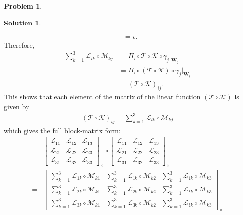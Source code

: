 \documentclass{article}
\theoremstyle{definition}
\newtheorem*{prob*}{Problem}
\newtheorem*{sln*}{Solution}
\newcommand{\W}{\mathbf{W}}
\newcommand{\lag}{\mathcal{L}}
\newcommand{\M}{\mathcal{M}}
\newcommand{\K}{\mathcal{K}}
\newcommand{\T}{\mathcal{T}}
\begin{document}
\begin{prob*}
\begin{sln*}
\begin{enumerate}
\begin{enumerate}
\begin{align*}
			&= v.
			\end{align*}
			Therefore,
			\begin{align*}
			\sum^3_{k=1} \lag_{ik} \circ \M_{kj} 
			&= \Pi_i \circ \T \circ \K \circ \gamma_j\bigg\vert_{\W_j}\\
			&= \Pi_i \circ \left(\T \circ \K\right) \circ \gamma_j\bigg\vert_{\W_j}\\
			&= (\T \circ \K)_{ij}.
			\end{align*}
			This shows that each element of the matrix of the linear function $(\T\circ \K)$ is given by
			\begin{align*}
			\boxed{(\T\circ\K)_{ij} = \sum^3_{k=1} \lag_{ik} \circ \M_{kj}}
			\end{align*}
			which gives the full block-matrix form:
			\begin{align*}
			&\begin{bmatrix}
			\lag_{11} & \lag_{12} & \lag_{13}\\
			\lag_{21} & \lag_{22} & \lag_{23}\\
			\lag_{31} & \lag_{32} & \lag_{33} 
			\end{bmatrix}_\times
			\circ 
			\begin{bmatrix}
			\lag_{11} & \lag_{12} & \lag_{13}\\
			\lag_{21} & \lag_{22} & \lag_{23}\\
			\lag_{31} & \lag_{32} & \lag_{33} 
			\end{bmatrix}_\times\\
			=
			&\begin{bmatrix}
			\sum^3_{k=1} \lag_{1k} \circ \M_{k1} &
			\sum^3_{k=1} \lag_{1k} \circ \M_{k2} &
			\sum^3_{k=1} \lag_{1k} \circ \M_{k3} \\
			\sum^3_{k=1} \lag_{2k} \circ \M_{k1} &
			\sum^3_{k=1} \lag_{2k} \circ \M_{k2} &
			\sum^3_{k=1} \lag_{2k} \circ \M_{k3} \\
			\sum^3_{k=1} \lag_{3k} \circ \M_{k1} &
			\sum^3_{k=1} \lag_{3k} \circ \M_{k2} &
			\sum^3_{k=1} \lag_{3k} \circ \M_{k3} 
			\end{bmatrix}_\times
			\end{align*}
			
			\end{enumerate}
			
			
			
			
			
			\newpage
			
		\end{enumerate}
			 
			
	\end{sln*}
	
	
\end{prob*}
\end{document}
